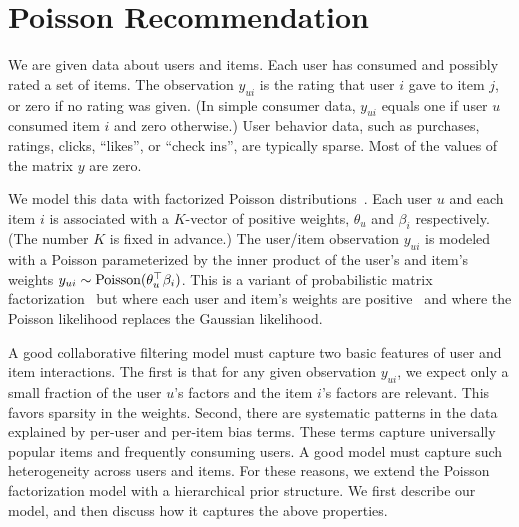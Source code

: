\section{Poisson Recommendation}
\label{sec:model}


We are given data about users and items.  Each user has consumed and
possibly rated a set of items.  The observation $y_{ui}$ is the rating
that user $i$ gave to item $j$, or zero if no rating was given.  (In
simple consumer data, $y_{ui}$ equals one if user $u$ consumed item
$i$ and zero otherwise.)  User behavior data, such as purchases,
ratings, clicks, ``likes'', or ``check ins'', are typically sparse.
Most of the values of the matrix $y$ are zero.

We model this data with factorized Poisson
distributions~\cite{Canny:2004}. Each user $u$ and each item $i$ is
associated with a $K$-vector of positive weights, $\theta_u$ and
$\beta_i$ respectively.  (The number $K$ is fixed in advance.)  The
user/item observation $y_{ui}$ is modeled with a Poisson parameterized
by the inner product of the user's and item's weights $y_{ui} \sim
\textrm{Poisson}(\theta_u^\top \beta_i)$.  This is a variant of probabilistic
matrix factorization~\cite{Salakhutdinov:2008a} but where each user
and item's weights are positive~\cite{Lee:1999} and where the Poisson
likelihood replaces the Gaussian likelihood.

A good collaborative filtering model must capture two basic features
of user and item interactions. The first is that for any given
observation $y_{ui}$, we expect only a small fraction of the user
$u$'s factors and the item $i$'s factors are relevant. This favors
sparsity in the weights. Second, there are systematic patterns in the
data explained by per-user and per-item bias terms. These terms
capture universally popular items and frequently consuming users. A
good model must capture such heterogeneity across users and items.
For these reasons, we extend the Poisson factorization model with a
hierarchical prior structure. We first describe our model, and then
discuss how it captures the above properties.


